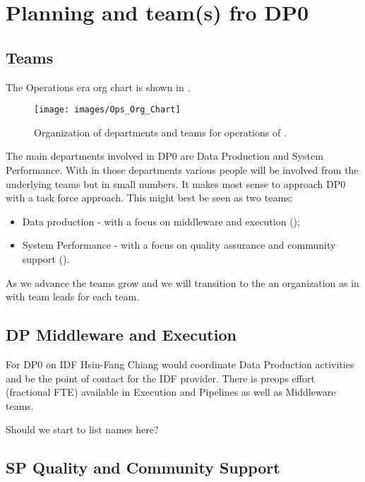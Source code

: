 \section{Planning and team(s) fro DP0} \label{sec:plan}


\subsection {Teams}

The Operations era org chart is shown in .


\begin{figure}
\texttt{[image: images/Ops\_Org\_Chart]}
\caption{ Organization of departments and teams  for operations of \RO. \label{fig:org}}
\end{figure}

The main departments involved in DP0 are Data Production and System Performance. With in those departments various people will be involved from the underlying teams but in small numbers. It makes most sense to approach DP0 with a task force approach. This might best be seen as two teams:

\begin{itemize}
\item Data production - with a focus on middleware and execution ();
\item System Performance - with a focus on quality assurance and community support ().
\end{itemize}

As we advance the teams grow and we will transition to the an organization as in 
with team leads for each team.

\subsection{DP Middleware and Execution}\label{sec:dp}
For DP0 on IDF Hsin-Fang Chiang would coordinate Data Production activities and be the point
of contact for the IDF provider.
There is preops effort (fractional FTE) available in Execution and Pipelines as well as Middleware teams.

{\color{red} Should we start to list names here?}

\subsection{SP Quality  and Community Support} \label{sec:sp}

